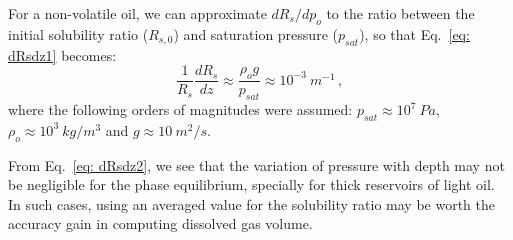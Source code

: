 \documentclass[authoryear,preprint,review,11pt]{elsarticle}
\begin{document}
For a non-volatile oil, we can approximate $dR_s / dp_o$ to the ratio between the initial solubility ratio ($R_{s,0}$) and saturation pressure ($p_{sat}$), so that Eq.~\eqref{eq: dRsdz1} becomes:
\begin{equation}\label{eq: dRsdz2}
\frac{1}{R_s}\frac{d R_s}{dz} \approx \frac{\rho_o g }{p_{sat}} \approx 10^{-3}\ m^{-1} \, ,
\end{equation}
where the following orders of magnitudes were assumed: $p_{sat} \approx 10^{7}\ Pa$, $\rho_o \approx 10^{3}\ kg/m^3$ and $g \approx 10\ m^2/s$. 

From Eq.~\eqref{eq: dRsdz2}, we see that the variation of pressure with depth may not be negligible for the phase equilibrium,  specially for thick reservoirs of light oil. In such cases, using an averaged value for the solubility ratio may be worth the accuracy gain in computing dissolved gas volume.





\end{document}
